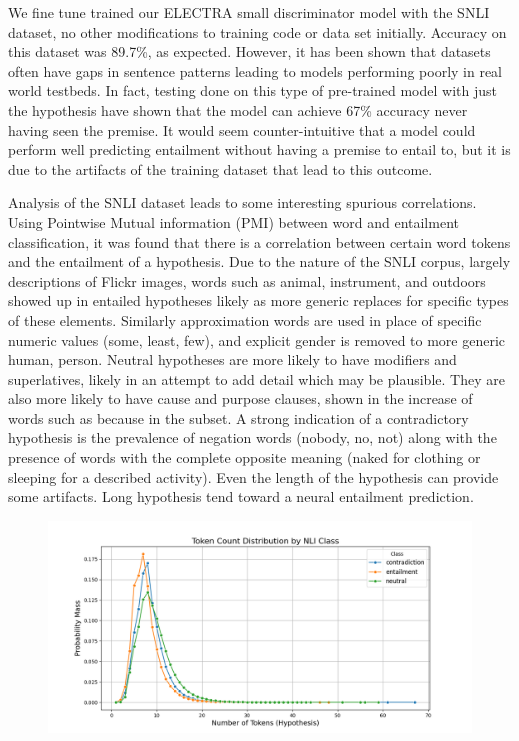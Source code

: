 \documentclass[11pt]{article}
\begin{document}
We fine tune trained our ELECTRA small discriminator model with the SNLI dataset, no other modifications to training code or data set initially.  Accuracy on this dataset was 89.7\%, as expected. However, it has been shown that datasets often have gaps in sentence patterns leading to models performing poorly in real world testbeds. In fact, testing done on this type of pre-trained model with just the hypothesis have shown that the model can achieve 67\% accuracy never having seen the premise.  It would seem counter-intuitive that a model could perform well predicting entailment without having a premise to entail to, but it is due to the artifacts of the training dataset that lead to this outcome.

Analysis of the SNLI dataset leads to some interesting spurious correlations. Using Pointwise Mutual information (PMI) between word and entailment classification, it was found that there is a correlation between certain word tokens and the entailment of a hypothesis. Due to the nature of the SNLI corpus, largely descriptions of Flickr images, words such as animal, instrument, and outdoors showed up in entailed hypotheses likely as more generic replaces for specific types of these elements. Similarly approximation words are used in place of specific numeric values (some, least, few), and explicit gender is removed to more generic human, person. 
Neutral hypotheses are more likely to have modifiers and superlatives, likely in an attempt to add detail which may be plausible.  They are also more likely to have cause and purpose clauses, shown in the increase of words such as because in the subset.  A strong indication of a contradictory hypothesis is the prevalence of negation words (nobody, no, not) along with the presence of words with the complete opposite meaning (naked for clothing or sleeping for a described activity). Even the length of the hypothesis can provide some artifacts. Long hypothesis tend toward a neural entailment prediction.\citealp{princeton}

\begin{figure}
    \centering
    \includegraphics[width=0.5\linewidth]{Figure_tokenvsprobmass.png}
    \caption{}
    \label{fig:enter-label}
\end{figure}
\end{document}
